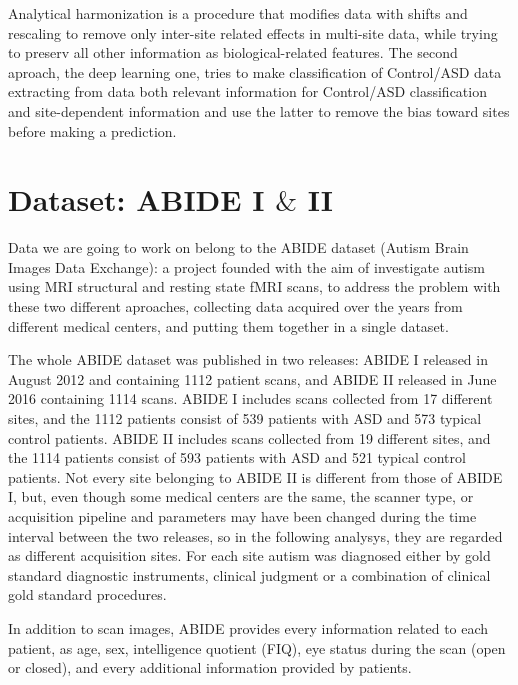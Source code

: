 \documentclass[a4paper,11pt]{article}
\begin{document}
Analytical harmonization is a procedure that modifies data with shifts and rescaling to remove only inter-site related effects in multi-site data, while trying to preserv all other information as biological-related features.
The second aproach, the deep learning one, tries to make classification of Control/ASD data extracting from data both relevant information for Control/ASD classification and site-dependent information and use the latter to remove the bias toward sites before making a prediction.





\section{Dataset: ABIDE I $\&$ II}


Data we are going to work on belong to the ABIDE dataset (Autism Brain Images Data Exchange): a project founded with the aim of investigate autism using MRI structural and resting state fMRI scans, to address the problem with these two different aproaches, collecting data acquired over the years from different medical centers, and putting them together in a single dataset.

The whole ABIDE dataset was published in two releases: ABIDE I released in August 2012 and containing 1112 patient scans, and ABIDE II released in June 2016 containing 1114 scans.
ABIDE I includes scans collected from 17 different sites, and the 1112 patients consist of 539 patients with ASD and 573 typical control patients.
ABIDE II includes scans collected from 19 different sites, and the 1114 patients consist of 593 patients with ASD and 521 typical control patients.
Not every site belonging to ABIDE II is different from those of ABIDE I, but, even though some medical centers are the same, the scanner type, or acquisition pipeline and parameters may have been changed during the time interval between the two releases, so in the following analysys, they are regarded as different acquisition sites.
For each site autism was diagnosed either by gold standard diagnostic instruments, clinical judgment or a combination of clinical gold standard procedures.

In addition to scan images, ABIDE provides every information related to each patient, as age, sex, intelligence quotient (FIQ), eye status during the scan (open or closed), and every additional information provided by patients.
\end{document}
